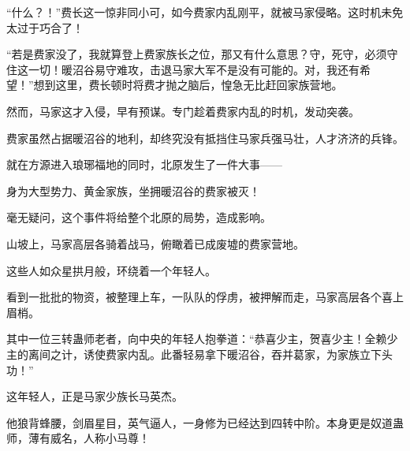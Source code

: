 \begin{this_body}
“什么？！”费长这一惊非同小可，如今费家内乱刚平，就被马家侵略。这时机未免太过于巧合了！

“若是费家没了，我就算登上费家族长之位，那又有什么意思？守，死守，必须守住这一切！暖沼谷易守难攻，击退马家大军不是没有可能的。对，我还有希望！”想到这里，费长顿时将费才抛之脑后，惶急无比赶回家族营地。

然而，马家这才入侵，早有预谋。专门趁着费家内乱的时机，发动突袭。

费家虽然占据暖沼谷的地利，却终究没有抵挡住马家兵强马壮，人才济济的兵锋。

就在方源进入琅琊福地的同时，北原发生了一件大事——

身为大型势力、黄金家族，坐拥暖沼谷的费家被灭！

毫无疑问，这个事件将给整个北原的局势，造成影响。

山坡上，马家高层各骑着战马，俯瞰着已成废墟的费家营地。

这些人如众星拱月般，环绕着一个年轻人。

看到一批批的物资，被整理上车，一队队的俘虏，被押解而走，马家高层各个喜上眉梢。

其中一位三转蛊师老者，向中央的年轻人抱拳道：“恭喜少主，贺喜少主！全赖少主的离间之计，诱使费家内乱。此番轻易拿下暖沼谷，吞并葛家，为家族立下头功！”

这年轻人，正是马家少族长马英杰。

他狼背蜂腰，剑眉星目，英气逼人，一身修为已经达到四转中阶。本身更是奴道蛊师，薄有威名，人称小马尊！

\end{this_body}

